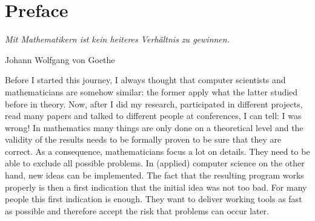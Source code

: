 \cleardoublepage

\normalsize

\chapter{Preface}
\setlength{\epigraphrule}{0pt}
\setlength{\epigraphwidth}{0.75\textwidth}
\epigraph{\textit{Mit Mathematikern ist kein heiteres Verhältnis zu gewinnen.}}{Johann Wolfgang von Goethe}

Before I started this journey, I always thought that computer scientists and mathematicians are somehow similar: the former apply what the latter studied before in theory.
Now, after I did my research, participated in different projects, read many  papers  and talked to different people at conferences, I can tell: I was wrong! In mathematics many things 
are only done on a theoretical level and the validity 
of the results needs to be formally proven to be sure that they are correct. As a consequence, mathematicians focus a lot on details. They 
need to be able to exclude all possible problems. In (applied) computer science on the other hand, new ideas can be implemented.
The fact that the resulting program works properly is then a first indication that the initial idea was not too bad.
For many people this first indication is enough. They want to deliver working tools as fast as possible and therefore accept the risk
that problems can occur later. 

